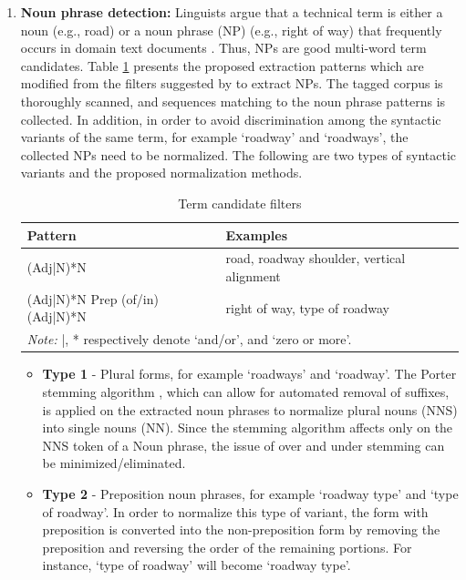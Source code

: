 \documentclass[Journal,InsideFigs, DoubleSpace]{ascelike} %
\begin{document}
{\begin{enumerate} [label=\roman*]
	\item \textbf{Noun phrase detection:} Linguists argue that a technical term is either a noun (e.g., road) or a noun phrase (NP) (e.g., right of way) that frequently occurs in domain text documents \cite{justeson95}. Thus, NPs are good multi-word term candidates. Table \ref{table:term_filter} presents the proposed extraction patterns which are modified from the filters suggested by  to extract NPs. The tagged corpus is thoroughly scanned, and sequences matching to the noun phrase patterns is collected. 
	In addition, in order to avoid discrimination among the syntactic variants of the same term, for example `roadway' and `roadways', the collected NPs need to be normalized. The following are two types of syntactic variants and the proposed normalization methods.
	\begin{table} [t]
		\caption{Term candidate filters}
		\label{table:term_filter}
		\centering
		\small
		\renewcommand{\arraystretch}{1.25}
		\begin{tabular}{l l}
			\hline
			\textbf{Pattern} & \textbf{Examples}\\
			\hline
			(Adj|N)*N		& road, roadway shoulder, vertical alignment\\
			(Adj|N)*N Prep (of/in) (Adj|N)*N	&	right of way, type of roadway\\
			\hline
			\multicolumn{2}{l}{\textit{Note:} |, * respectively denote `and/or', and `zero or more'.  } \\
			\hline
		\end{tabular}
		\normalsize
	\end{table}
	\begin{itemize}
		\item \textbf{Type 1} - Plural forms, for example `roadways' and `roadway'. The Porter stemming algorithm \cite{porter80}, which can allow for automated removal of suffixes, is applied on the extracted noun phrases to normalize plural nouns (NNS) into single nouns (NN). Since the stemming algorithm affects only on the NNS token of a Noun phrase, the issue of over and under stemming can be minimized/eliminated. %
		\item \textbf{Type 2} - Preposition noun phrases, for example `roadway type' and `type of roadway'. In order to normalize this type of variant, the form with preposition is converted into the non-preposition form by removing the preposition and reversing the order of the remaining portions. For instance, `type of roadway' will become `roadway type'.

\end{itemize}
\end{enumerate}}
\end{document}
